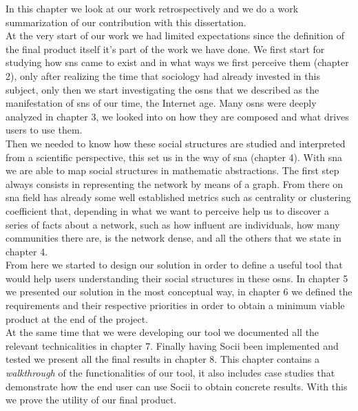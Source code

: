 In this chapter we look at our work retrospectively and we do a work summarization of our contribution with this
dissertation.\\
\indent At the very start of our work we had limited expectations since the definition of the final product itself it's part of the work we have done. We first start for studying how \glspl{sn} came to exist and in what ways we first perceive them (chapter 2), only after realizing the time that sociology had already invested in this subject, only then we start investigating the \glspl{osn} that we described as the manifestation of \glspl{sn} of our time, the Internet age. Many \glspl{osn} were deeply analyzed in chapter 3, we looked into on how they are composed and what drives users to use them.\\
\indent Then we needed to know how these social structures are studied and interpreted from a scientific perspective, this set us in the way of \gls{sna} (chapter 4). With \gls{sna} we are able to map social structures in mathematic abstractions. The first step always consists in representing the network by means of a graph. From there on \gls{sna} field has already some well established metrics such as centrality or clustering coefficient that, depending in what we want to perceive help us to discover a series of facts about a network, such as how influent are individuals, how many communities there are, is the network dense, and all the others that we state in chapter 4.\\
\indent From here we started to design our solution in order to define a useful tool that would help users understanding their social structures in these \glspl{osn}. In chapter 5 we presented our solution in the most conceptual way, in chapter 6 we defined the requirements and their respective priorities in order to obtain a minimum viable product at the end of the project.\\
\indent At the same time that we were developing our tool we documented all the relevant technicalities in chapter 7. Finally having Socii been implemented and tested we present all the final results in chapter 8. This chapter contains a \textit{walkthrough} of the functionalities of our tool, it also includes case studies that demonstrate how the end user can use Socii to obtain concrete results. With this we prove the utility of our final product.

